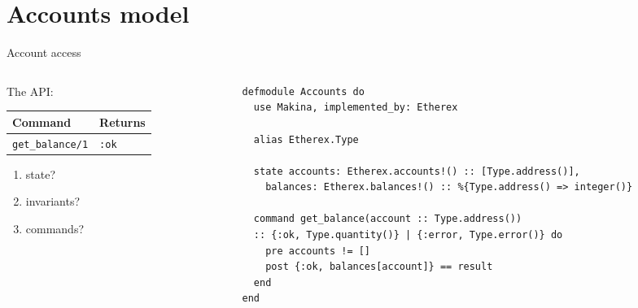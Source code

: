 \documentclass[aspectratio=169, 10pt]{beamer}
\begin{document}
\section{Accounts model}
\label{sec:orga301283}

\begin{frame}[label={sec:orgf997a46},fragile]{Account access}
 \begin{columns}
\begin{column}{0.28\columnwidth}
The API:

\begin{center}
\begin{tabular}{ll}
Command & Returns\\
\hline
\texttt{get\_balance/1} & \texttt{:ok}\\
\end{tabular}
\end{center}

\vspace{0.5cm}

\begin{enumerate}
\item state?
\item invariants?
\item commands?
\end{enumerate}
\end{column}

\begin{column}{0.68\columnwidth}
\lstset{language=elixir,label= ,caption= ,captionpos=b,numbers=none,style=display}
\begin{lstlisting}
defmodule Accounts do
  use Makina, implemented_by: Etherex

  alias Etherex.Type

  state accounts: Etherex.accounts!() :: [Type.address()],
    balances: Etherex.balances!() :: %{Type.address() => integer()}

  command get_balance(account :: Type.address())
  :: {:ok, Type.quantity()} | {:error, Type.error()} do
    pre accounts != []
    post {:ok, balances[account]} == result
  end
end
\end{lstlisting}
\end{column}
\end{columns}
\end{frame}
\end{document}
